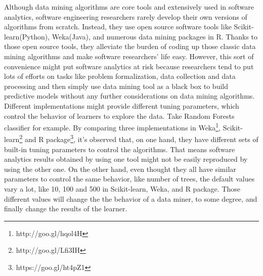 Although data mining algorithms are core tools and extensively used in software analytics, software engineering 
researchers rarely develop their own versions of algorithms from scratch. Instead, they use
open source software tools like  
Scikit-learn(Python)\cite{scikit-learn}, Weka(Java)\cite{hall2009weka}, and numerous data mining packages in R. Thanks to those open 
source tools, they alleviate the burden of coding up those classic data mining algorithms and make
software researchers' life easy. However, this sort of convenience might put 
software analytics at risk because researchers tend to put lots of efforts on tasks like problem formalization, 
data collection and data processing and then simply use data mining tool as a black box to build 
predictive models without any further considerations on data mining algorithms\cite{sun2010discriminative,jalbert2008automated, antoniol2008bug,zanetti2013categorizing,lamkanfi2011comparing,tian2013drone, alipour2013contextual,lin2009empirical,hall11,me07b,choetkiertikul2015predicting,anvik2006should, bhattacharya2010fine}.
Different implementations might
provide different tuning parameters, which control the behavior of learners to explore the data.
Take Random Forests classifier for example.
By comparing three implementations in Weka\footnote {http://goo.gl/hqol4H}, 
Scikit-learn\footnote{http://goo.gl/Lfi3IH} and R package\footnote{https://goo.gl/ht4pZ1}, 
it's observed that, on one hand, they have different sets of built-in tuning parameters
to control the algorithms. That means software analytics results obtained by
using one tool might not be easily reproduced by using the other one.
On the other hand, even thought they all have similar parameters to control
the same behavior, like number of trees, the default values vary a lot, like
10, 100 and 500 in Scikit-learn, Weka, and R package. 
Those different values will change the the behavior of a data miner, 
to some degree, and finally change the results of the learner.



